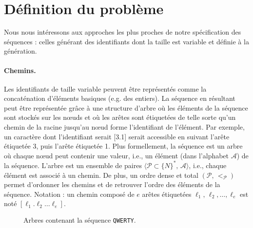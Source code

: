 
\section{Définition du problème}
\label{repl:sec:problem}


Nous nous intéressons aux approches les plus proches de notre spécification des
séquences : celles générant des identifiants dont la taille est variable et
définie à la génération.

\paragraph{Chemins.}

Les identifiants de taille variable peuvent être représentés comme la
concaténation d'éléments basiques (e.g. des entiers). La séquence en résultant
peut être représentée grâce à une structure d'arbre où les éléments de la
séquence sont stockés sur les nœuds et où les arêtes sont étiquetées de telle
sorte qu'un chemin de la racine jusqu'au nœud forme l'identifiant de
l'élément. Par exemple, un caractère dont l'identifiant serait [3.1] serait
accessible en suivant l'arête étiquetée 3, puis l'arête étiquetée 1. Plus
formellement, la séquence est un arbre où chaque nœud peut contenir une valeur,
i.e., un élément (dans l'alphabet $\mathcal{A}$) de la séquence. L'arbre est un
ensemble de paires $\langle \mathcal{P}\subset \{N\}^*,\, \mathcal{A} \rangle$,
i.e., chaque élément est associé à un chemin. De plus, un ordre dense et total
$(\mathcal{P},\, <_\mathcal{P})$ permet d'ordonner les chemins et de retrouver
l'ordre des éléments de la séquence. Notation : un chemin composé de $e$ arêtes
étiquetées $\ell_1,\,\ell_2,\ldots,\ell_e$ est noté
$[\ell_1.\ell_2\ldots\ell_e]$.

\begin{figure}
  \centering
  \hspace{20pt}
  \caption[Arbres contenant une séquence répliquée]
  {Arbres contenant la séquence \texttt{QWERTY}.}
\end{figure}

